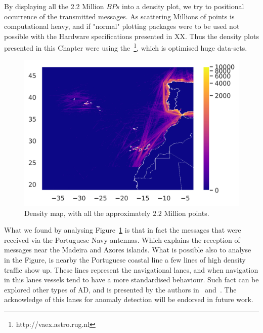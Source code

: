 By displaying all the 2.2 Million $BPs$ into a density plot, we try to positional occurrence of the transmitted messages. As scattering Millions of points is computational heavy, and if "normal" plotting packages were to be used not possible with the Hardware specifications presented in XX. Thus the density plots presented in this Chapter were using the~\footnote{http://vaex.astro.rug.nl}, which is optimised huge data-sets. 

\begin{figure}[H]
	\centering
	\includegraphics[scale = 1]{figures/Ch5/ThesisExpDensity.png}
    \caption{Density map, with all the approximately
    $2.2$ Million points.}
    \label{fig: 5 Exp1DensityMap}
\end{figure}

What we found by analysing Figure~\ref{fig: 5 Exp1DensityMap} is that in fact the messages that were received via the Portuguese Navy antennas. Which explains the reception of messages near the Madeira and Azores islands.  What is possible also to analyse in the Figure, is nearby the Portuguese coastal line a few lines of high density traffic show up. These lines represent the navigational lanes, and when navigation in this lanes vessels tend to have a more standardised behaviour. Such fact can be explored other types of AD, and is presented by the authors in~\cite{Yan2016} and~\cite{Silveira2013UsePortugal}. The acknowledge of this lanes for anomaly detection will be endorsed in future work.


